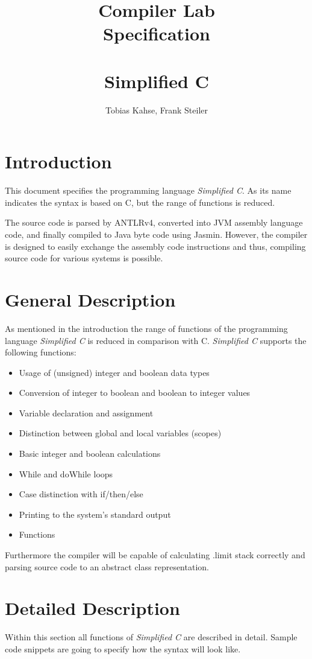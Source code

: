 \documentclass[12pt,a4paper,titlepage,oneside,final]{article}
\author{Tobias Kahse, Frank Steiler}
\title{Compiler Lab\\Specification\\~\\Simplified C}
\begin{document}
\maketitle

\tableofcontents
\pagebreak

\section{Introduction}
This document specifies the programming language \emph{Simplified C}. As its name indicates the syntax is based on C, but the range of functions is reduced.

The source code is parsed by ANTLRv4, converted into JVM assembly language code, and finally compiled to Java byte code using Jasmin. However, the compiler is designed to easily exchange the assembly code instructions and thus, compiling source code for various systems is possible.

\section{General Description}
As mentioned in the introduction the range of functions of the programming language \emph{Simplified C} is reduced in comparison with C. \emph{Simplified C} supports the following functions:

\begin{itemize}
\item Usage of (unsigned) integer and boolean data types
\item Conversion of integer to boolean and boolean to integer values
\item Variable declaration and assignment
\item Distinction between global and local variables (scopes)
\item Basic integer and boolean calculations
\item While and doWhile loops
\item Case distinction with if/then/else
\item Printing to the system's standard output
\item Functions
\end{itemize}

Furthermore the compiler will be capable of calculating .limit stack correctly and parsing source code to an abstract class representation.

\section{Detailed Description}
Within this section all functions of \emph{Simplified C} are described in detail. Sample code snippets are going to specify how the syntax will look like.
\end{document}
